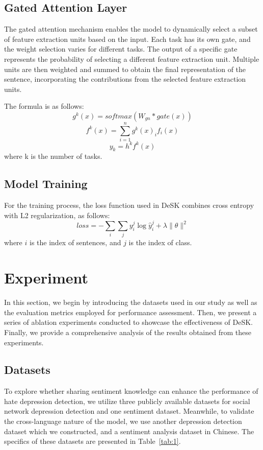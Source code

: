 \documentclass[runningheads]{llncs}
\begin{document}
\subsection{Gated Attention Layer}
The gated attention mechanism enables the model to dynamically select a subset of feature extraction units based on the input. Each task has its own gate, and the weight selection varies for different tasks. The output of a specific gate represents the probability of selecting a different feature extraction unit. Multiple units are then weighted and summed to obtain the final representation of the sentence, incorporating the contributions from the selected feature extraction units.

 The formula is as follows:
 $$g^k(x) = softmax(W_{gn} * gate(x))$$
 $$f^k(x) = \sum^{n}_{i=1}g^k(x)_if_i(x)$$
 $$y_k = h^kf^k(x)$$
 where k is the number of tasks.

 \subsection{Model Training}
For the training process, the loss function used in DeSK combines cross entropy with L2 regularization, as follows:
$$loss = -\sum\limits_i\sum\limits_j y_i^j\log{\hat{y}_i^j}+\lambda\|\theta\|^2$$
where $i$ is the index of sentences, and $j$ is the index of class. 

\section{Experiment}
In this section, we begin by introducing the datasets used in our study as well as the evaluation metrics employed for performance assessment. Then, we present a series of ablation experiments conducted to showcase the effectiveness of DeSK. Finally, we provide a comprehensive analysis of the results obtained from these experiments.




\subsection{Datasets}
To explore whether sharing sentiment knowledge can enhance the performance of hate depression detection, we utilize three publicly available datasets for social network depression detection and one sentiment dataset. Meanwhile, to validate the cross-language nature of the model, we use another depression detection dataset which we constructed, and a sentiment analysis dataset in Chinese. The specifics of these datasets are presented in Table~\ref{tab:1}.
\end{document}
